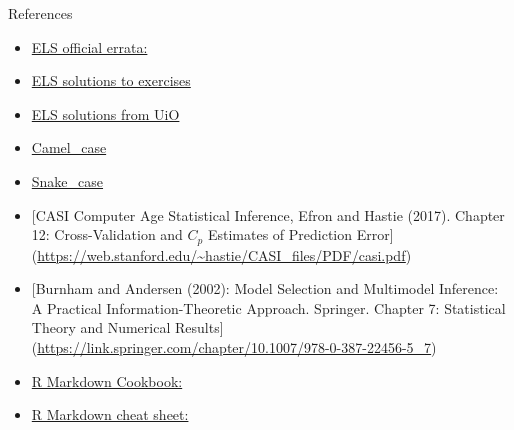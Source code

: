 \documentclass[
  ignorenonframetext,
]{beamer}
\begin{document}
\begin{frame}{References}
\protect\hypertarget{references}{}

\begin{itemize}
\item
  \href{https://web.stanford.edu/~hastie/ElemStatLearn/errata2.html}{ELS
  official errata:}
\item
  \href{https://waxworksmath.com/Authors/G_M/Hastie/hastie.html}{ELS
  solutions to exercises}
\item
  \href{https://www.uio.no/studier/emner/matnat/math/STK-IN4300/h20/exercises.html}{ELS
  solutions from UiO}
\item
  \href{https://en.wikipedia.org/wiki/Camel_case}{Camel\_case}
\item
  \href{https://en.wikipedia.org/wiki/Snake_case}{Snake\_case}
\item
  {[}CASI Computer Age Statistical Inference, Efron and Hastie (2017).
  Chapter 12: Cross-Validation and \(C_p\) Estimates of Prediction
  Error{]}
  (\url{https://web.stanford.edu/~hastie/CASI_files/PDF/casi.pdf})
\item
  {[}Burnham and Andersen (2002): Model Selection and Multimodel
  Inference: A Practical Information-Theoretic Approach. Springer.
  Chapter 7: Statistical Theory and Numerical Results{]}
  (\url{https://link.springer.com/chapter/10.1007/978-0-387-22456-5_7})
\item
  \href{https://bookdown.org/yihui/rmarkdown-cookbook/}{R Markdown
  Cookbook:}
\item
  \href{https://rstudio.com/wp-content/uploads/2015/03/rmarkdown-reference.pdf}{R
  Markdown cheat sheet:}
\end{itemize}

\end{frame}
\end{document}
